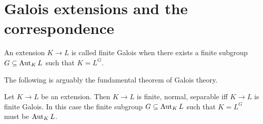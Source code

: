 \documentclass{article}
\begin{document}


\section{Galois extensions and the correspondence}

\begin{dfn}
  An extension $K \to L$ is called finite Galois
  when there exists a finite subgroup $G \subseteq \operatorname{Aut}_K L$
  such that $K = L^G$.
\end{dfn}

The following is arguably the fundamental theorem of Galois theory.

\begin{prop}
  Let $K \to L$ be an extension.
  Then $K \to L$ is finite, normal, separable
  iff $K \to L$ is finite Galois.
  In this case the finite subgroup $G \subseteq \operatorname{Aut}_K L$ such that $K = L^G$
  must be $\operatorname{Aut}_K L$.
\end{prop}


  


\end{document}

